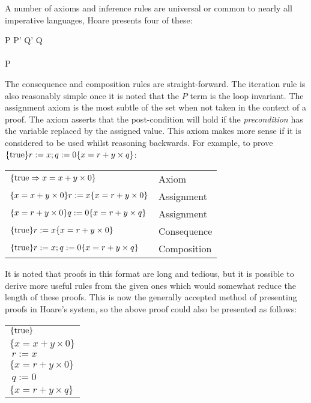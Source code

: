 \documentclass[a4paper,notitlepage]{report}
\begin{document}
  A number of axioms and inference rules are universal or common to nearly all
  imperative languages, Hoare presents four of these:
  \begin{display}{}
    {} \qquad

    { \quad P \impl P' \quad Q' \impl Q}
    {} \\
    \\
    {P \quad {}}
    {} \qquad

    { \quad {}}
    {}
  \end{display}

  The consequence and composition rules are straight-forward. The iteration rule
  is also reasonably simple once it is noted that the $P$ term is the loop
  invariant. The assignment axiom is the most subtle of the set when not taken
  in the context of a proof. The axiom asserts that the post-condition will hold
  if the \emph{precondition} has the variable replaced by
  the assigned value. This axiom makes more sense if it is considered to be used
  whilst reasoning backwards. For example, to prove $\{\text{true}\}r := x; q :=
  0\{x = r + y \times q\}$:

  \begin{tabular}{ll}
    $\{\text{true} \Rightarrow x = x + y \times 0 \}$ & Axiom \\
    $\{x = x + y \times 0\}r:=x\{x = r + y \times 0\}$ & Assignment \\
    $\{x = r + y \times 0\}q:=0\{x = r + y \times q\}$ & Assignment \\
    $\{\text{true}\}r:=x\{x = r + y \times 0\}$ & Consequence \\
    $\{\text{true}\}r:=x; q:=0\{x = r + y \times q\}$ & Composition\\
  \end{tabular}

  It is noted that proofs in this format are long and tedious, but it is
  possible to derive more useful rules from the given ones which would somewhat
  reduce the length of these proofs. This is now the generally accepted method
  of presenting proofs in Hoare's system, so the above proof could also be
  presented as follows:

  \begin{tabular}{l}
    $\{\text{true}\}$ \\
    $\{x = x + y \times 0\}$ \\
    $\ r:=x$ \\
    $\{x = r + y \times 0\}$ \\
    $\ q:=0$ \\
    $\{x = r + y \times q\}$
  \end{tabular}
\end{document}
